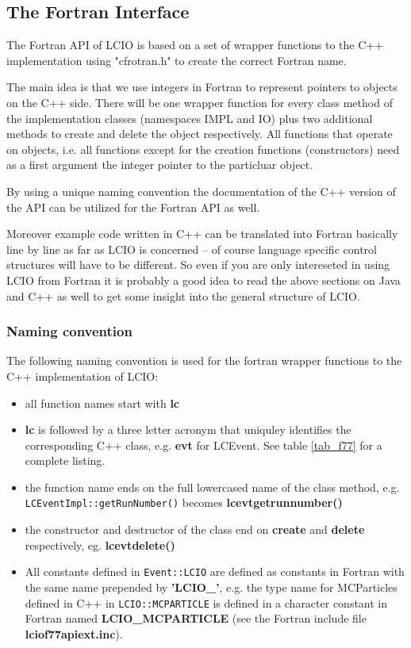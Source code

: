 \subsection{The Fortran Interface} \label{f77api}

The Fortran API of LCIO is based on a set of wrapper functions to the 
C++ implementation using "cfrotran.h" to create the correct Fortran name.

The main idea is that we use integers in Fortran to represent pointers to 
objects on the C++ side. There will be one wrapper function for every class method
of the implementation classes (namespaces IMPL and IO) plus two additional methods 
to create and delete the object respectively. All functions that operate on objects, i.e.
all functions except for the creation functions (constructors) need as a first argument 
the integer pointer to the particluar object.

By using a unique naming convention the documentation of the C++ version of the API
can be utilized for the Fortran API as well.

Moreover example code written in C++ can be translated into Fortran basically line by 
line as far as LCIO is concerned -- of course language specific control structures 
will have to be different. So even if you are only intereseted in using LCIO from Fortran 
it is probably a good idea to read the above sections on Java and C++ as well to get some 
insight into the general structure of LCIO.

\subsubsection{Naming convention}
The following naming convention is used for the fortran wrapper functions to the 
C++ implementation of LCIO:
\begin{itemize}

\item{all function names start with {\bf lc}}

\item{{\bf lc} is followed by a three letter acronym that uniquley identifies the 
corresponding C++ class, e.g. {\bf evt} for LCEvent.} See table \ref{tab_f77} for a complete 
listing.

\item{the function name ends on the full lowercased name of the class method, e.g. \\
 \verb$LCEventImpl::getRunNumber()$ becomes  {\bf lcevtgetrunnumber() } }

\item{the constructor and destructor of the class  end on {\bf create} and {\bf delete} 
respectively, eg. {\bf lcevtdelete()} }

\item{All constants defined in \verb$Event::LCIO$ are defined as constants in Fortran with the 
same name prepended by {\bf 'LCIO\_'}, e.g. the type name for MCParticles defined in C++ in
\verb$LCIO::MCPARTICLE$ is defined in a character constant in Fortran named
{\bf LCIO\_MCPARTICLE} (see the Fortran include file {\bf lciof77apiext.inc}).}

\end{itemize}

